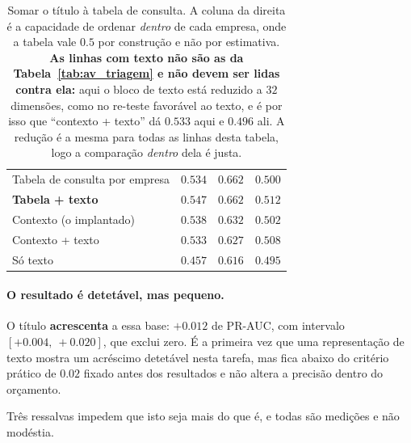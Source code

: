 \begin{table}[ht]
\caption[O texto por cima da tabela de consulta]{Somar o título à tabela de consulta. A coluna
da direita é a capacidade de ordenar \emph{dentro} de cada empresa, onde a tabela vale $0.5$ por
construção e não por estimativa. \textbf{As linhas com texto não são as da
Tabela~\ref{tab:av_triagem} e não devem ser lidas contra ela:} aqui o bloco de texto está reduzido
a $32$ dimensões, como no re-teste favorável ao texto, e é por isso que ``contexto + texto'' dá
$0.533$ aqui e $0.496$ ali. A redução é a mesma para todas as linhas desta tabela, logo a
comparação \emph{dentro} dela é justa.}
\label{tab:av_acrescimo}
\centering
\small
\begin{tabular}{L{0.40\textwidth} C{0.13\textwidth} C{0.13\textwidth} C{0.17\textwidth}}
\toprule
{} &  &  &  \\
\midrule
Tabela de consulta por empresa & $0.534$ & $\mathbf{0.662}$ & $0.500$ \\
\textbf{Tabela + texto} & $\mathbf{0.547}$ & $\mathbf{0.662}$ & $0.512$ \\
Contexto (o implantado) & $0.538$ & $0.632$ & $0.502$ \\
Contexto + texto & $0.533$ & $0.627$ & $0.508$ \\
Só texto & $0.457$ & $0.616$ & $0.495$ \\
\bottomrule
\end{tabular}
\end{table}

\paragraph{O resultado é detetável, mas pequeno.} O título \textbf{acrescenta} a essa base:
$+0.012$ de PR-AUC, com intervalo $[+0.004,\ +0.020]$, que exclui zero. É a primeira vez que uma
representação de texto mostra um acréscimo detetável nesta tarefa, mas fica abaixo do critério
prático de $0.02$ fixado antes dos resultados e não altera a precisão dentro do orçamento.

Três ressalvas impedem que isto seja mais do que é, e todas são medições e não modéstia.

